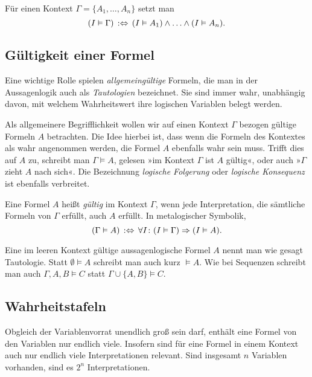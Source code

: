 \begin{Definition}\label{def:sat-context}
Für einen Kontext $\Gamma = \{A_1,\ldots,A_n\}$ setzt man
\[(I\vDash\Gamma)\,:\Leftrightarrow\, (I\vDash A_1)\land\ldots\land (I\vDash A_n).\]
\end{Definition}

\subsection{Gültigkeit einer Formel}

Eine wichtige Rolle spielen \emph{allgemeingültige} Formeln, die man
in der Aussagenlogik auch als \emph{Tautologien}
bezeichnet. Sie sind immer wahr, unabhängig davon, mit welchem
Wahrheitswert ihre logischen Variablen belegt werden.

Als allgemeinere Begrifflichkeit wollen wir auf einen Kontext $\Gamma$
bezogen gültige Formeln $A$ betrachten. Die Idee hierbei ist,
dass wenn die Formeln des Kontextes als wahr angenommen werden, die
Formel $A$ ebenfalls wahr sein muss. Trifft dies auf $A$ zu,
schreibt man $\Gamma\models A$, gelesen »im Kontext $\Gamma$ ist
$A$ gültig«, oder auch »$\Gamma$ zieht $A$ nach sich«. Die Bezeichnung
\emph{logische Folgerung} oder \emph{logische Konsequenz} ist
ebenfalls verbreitet.

\begin{Definition}\label{def:valid}\newlinefirst
Eine Formel $A$ heißt \emph{gültig} im Kontext $\Gamma$,
wenn jede Interpretation, die sämtliche Formeln von $\Gamma$ erfüllt,
auch $A$ erfüllt. In metalogischer Symbolik,
\[(\Gamma\vDash A)\,:\Leftrightarrow\,\forall I\colon (I\vDash\Gamma)\Rightarrow (I\vDash A).\]
\end{Definition}
Eine im leeren Kontext gültige aussagenlogische Formel $A$ nennt man
wie gesagt Tautologie. Statt $\emptyset\models A$ schreibt man auch
kurz $\models A$. Wie bei Sequenzen schreibt man auch $\Gamma,A,B\models C$
statt $\Gamma\cup\{A,B\}\models C$.

\subsection{Wahrheitstafeln}

Obgleich der Variablenvorrat unendlich groß sein darf, enthält eine
Formel von den Variablen nur endlich viele. Insofern sind für eine
Formel in einem Kontext auch nur endlich viele Interpretationen relevant.
Sind insgesamt $n$ Variablen vorhanden, sind es $2^n$ Interpretationen.

